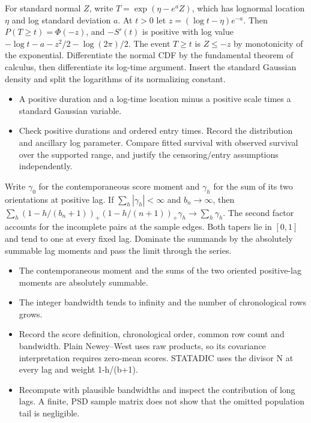 \expandafter\def\csname statadic@statement@STATADIC-SURVIVAL-005\endcsname{For standard normal $Z$, write $T=\exp(\eta-e^a Z)$,
  which has lognormal location $\eta$ and log standard deviation $a$.
  At $t>0$ let $z=(\log t-\eta)e^{-a}$. Then
  $P(T\ge t)=\Phi(-z)$, and $-S'(t)$ is positive with log value
  $-\log t-a-z^2/2-\log(2\pi)/2$.}
\expandafter\def\csname statadic@proof@STATADIC-SURVIVAL-005\endcsname{The event $T\ge t$ is $Z\le -z$ by monotonicity of the
  exponential. Differentiate the normal CDF by the fundamental theorem of
  calculus, then differentiate its log-time argument. Insert the standard
  Gaussian density and split the logarithms of its normalizing constant.}
\expandafter\def\csname statadic@assumptions@STATADIC-SURVIVAL-005\endcsname{\begin{itemize}
\item A positive duration and a log-time location minus a positive scale times a standard Gaussian variable.
\end{itemize}}
\expandafter\def\csname statadic@diagnostics@STATADIC-SURVIVAL-005\endcsname{\begin{itemize}
\item Check positive durations and ordered entry times. Record the distribution and ancillary log parameter. Compare fitted survival with observed survival over the supported range, and justify the censoring/entry assumptions independently.
\end{itemize}}
\expandafter\def\csname statadic@statement@STATADIC-HAC-003\endcsname{Write $\gamma_0$ for the contemporaneous score moment and
  $\gamma_h$ for the sum of its two orientations at positive lag. If
  $\sum_h |\gamma_h|<\infty$ and $b_n\to\infty$, then
  $\sum_h (1-h/(b_n+1))_+(1-h/(n+1))_+\gamma_h\to\sum_h\gamma_h$.
  The second factor accounts for the incomplete pairs at the sample edges.}
\expandafter\def\csname statadic@proof@STATADIC-HAC-003\endcsname{Both tapers lie in $[0,1]$ and tend to one at every fixed lag.
  Dominate the summands by the absolutely summable lag moments and pass the
  limit through the series.}
\expandafter\def\csname statadic@assumptions@STATADIC-HAC-003\endcsname{\begin{itemize}
\item The contemporaneous moment and the sums of the two oriented positive-lag moments are absolutely summable.
\item The integer bandwidth tends to infinity and the number of chronological rows grows.
\end{itemize}}
\expandafter\def\csname statadic@diagnostics@STATADIC-HAC-003\endcsname{\begin{itemize}
\item Record the score definition, chronological order, common row count and bandwidth. Plain Newey–West uses raw products, so its covariance interpretation requires zero-mean scores. STATADIC uses the divisor N at every lag and weight 1-h/(b+1).
\item Recompute with plausible bandwidths and inspect the contribution of long lags. A finite, PSD sample matrix does not show that the omitted population tail is negligible.
\end{itemize}}
